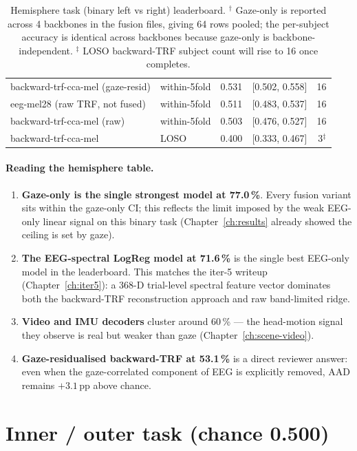 \begin{table}[ht]
\begin{tabular}{llrcr}
backward-trf-cca-mel (gaze-resid)      & within-5fold & 0.531 & [0.502, 0.558] & 16 \\
eeg-mel28 (raw TRF, not fused)         & within-5fold & 0.511 & [0.483, 0.537] & 16 \\
backward-trf-cca-mel (raw)             & within-5fold & 0.503 & [0.476, 0.527] & 16 \\
\midrule
backward-trf-cca-mel                   & LOSO         & 0.400 & [0.333, 0.467] & 3$^\ddagger$ \\
\bottomrule
\end{tabular}
\caption{Hemisphere task (binary left vs right) leaderboard. $^\dagger$
Gaze-only is reported across 4 backbones in the fusion files, giving
64 rows pooled; the per-subject accuracy is identical across backbones
because gaze-only is backbone-independent. $^\ddagger$ LOSO backward-TRF
subject count will rise to 16 once  completes.}
\end{table}

\paragraph{Reading the hemisphere table.}
\begin{enumerate}
  \item \textbf{Gaze-only is the single strongest model at 77.0\,\%}. Every
        fusion variant sits within the gaze-only CI; this reflects the
        limit imposed by the weak EEG-only linear signal on this binary
        task (Chapter~\ref{ch:results} already showed the ceiling is set
        by gaze).
  \item \textbf{The EEG-spectral LogReg model at 71.6\,\%} is the single
        best EEG-only model in the leaderboard. This matches the iter-5
        writeup (Chapter~\ref{ch:iter5}): a 368-D trial-level spectral
        feature vector dominates both the backward-TRF reconstruction
        approach and raw band-limited ridge.
  \item \textbf{Video and IMU decoders} cluster around 60\,\% — the head-motion
        signal they observe is real but weaker than gaze (Chapter~\ref{ch:scene-video}).
  \item \textbf{Gaze-residualised backward-TRF at 53.1\,\%} is a direct
        reviewer answer: even when the gaze-correlated component of EEG
        is explicitly removed, AAD remains $+3.1$\,pp above chance.
\end{enumerate}

\section{Inner / outer task (chance 0.500)}

